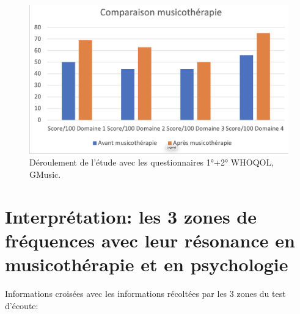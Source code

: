 \begin{figure}
\centering
\includegraphics[width=0.7\linewidth]{images/Compmusico.png}
\caption[Schéma du déroulement]{Déroulement de l'étude avec les
         questionnaires 1°+2° WHOQOL, GMusic.}
       
\label{groupecontroleimage1}
\end{figure}





  


\section{Interprétation: les 3 zones de fréquences avec leur résonance en musicothérapie et en
  psychologie}


	Informations croisées avec les informations récoltées par les 3 
          zones du test d'écoute:
          
